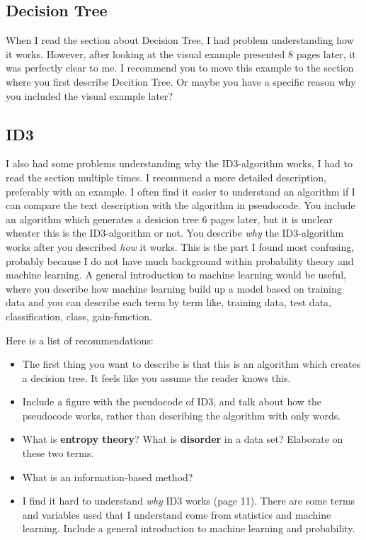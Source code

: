 \documentclass[
10pt, %
a4paper, %
oneside, %
headinclude,footinclude, %
BCOR5mm, %
]{scrartcl}
\begin{document}
{\subsection*{Decision Tree}
When I read the section about Decision Tree, I had problem understanding how it works. However, after looking at the visual example presented 8 pages later, it was perfectly clear to me. I recommend you to move this example to the section where you first describe Decition Tree. Or maybe you have a specific reason why you included the visual example later?

\subsection*{ID3}
I also had some problems  understanding why the ID3-algorithm works, I had to read the section multiple times. I recommend a more detailed description, preferably with an example. I often find it easier to understand an algorithm if I can compare the text description with the algorithm in pseudocode. You include an algorithm which generates a desicion tree 6 pages later, but it is unclear wheater this is the ID3-algorithm or not. 
\newline
\newline
You describe \emph{why} the ID3-algorithm works after you described \emph{how} it works. This is the part I found most confusing, probably because I do not have much background within probability theory and machine learning. A general introduction to machine learning would be useful, where you describe how machine learning build up a model based on training data and you can describe each term by term like, training data, test data, classification, class, gain-function. 

Here is a list of recommendations:
\begin{itemize}
    \item The first thing you want to describe is that this is an algorithm which creates a decision tree. It feels like you assume the reader knows this.
    \item Include a figure with the pseudocode of ID3, and talk about how the pseudocode works, rather than describing the algorithm with only words.
    \item What is \textbf{entropy theory}? What is \textbf{disorder} in a data set? Elaborate on these two terms.
    \item What is an information-based method?
    \item I find it hard to understand \emph{why} ID3 works (page 11). There are some terms and variables used that I understand come from statistics and machine learning. Include a general introduction to machine learning and probability.
\end{itemize}

}
\end{document}
